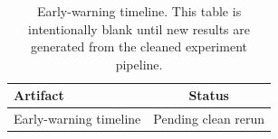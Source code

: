 \begin{table}[!htbp]
\centering
\footnotesize
\begin{tabular}{@{}lc@{}}
\toprule
Artifact & Status \\
\midrule
Early-warning timeline & Pending clean rerun \\
\bottomrule
\end{tabular}
\caption{Early-warning timeline. This table is intentionally blank until new results are generated from the cleaned experiment pipeline.}
\label{tab:alert_timeline}
\end{table}
